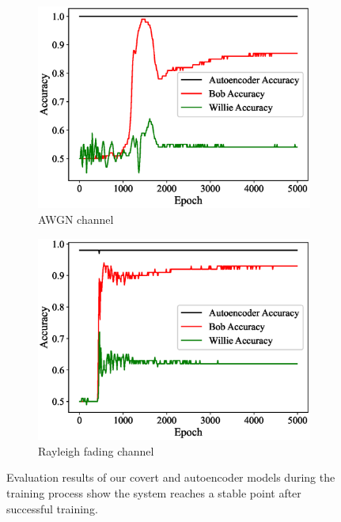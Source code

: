 \begin{figure}[tp!]
	\center
	\begin{subfigure}{0.24\textwidth}
		\includegraphics[width=\linewidth]{figs/multi_training_progress_awgn}
		\caption{AWGN channel}
	\end{subfigure}
	\hfill
	\begin{subfigure}{0.24\textwidth}
		\includegraphics[width=\linewidth]{figs/multi_training_progress_rayleigh}
		\caption{Rayleigh fading channel}	
	\end{subfigure}
	\caption{Evaluation results of our covert and autoencoder models during the training process show the system reaches a stable point after successful training.}
	\label{fig:multi_traning_progress}
\end{figure}


